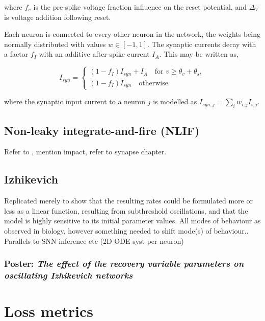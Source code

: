 \documentclass[mphil,deptreport,ai]{infthesis} %
\begin{document}
where $f_v$ is the pre-spike voltage fraction influence on the reset potential, and $\Delta_V$ is voltage addition following reset.

Each neuron is connected to every other neuron in the network, the weights being normally distributed with values $w \in [-1, 1]$. The synaptic currents decay with a factor $f_I$ with an additive after-spike current $I_A$. This may be written as,

\begin{equation}
    I_{syn} = \begin{cases}
        (1 - f_I) I_{syn} + I_A \quad \text{for } v \geq \theta_v + \theta_s,\\
        (1 - f_I) I_{syn} \quad \text{otherwise}
    \end{cases}
\end{equation}

where the synaptic input current to a neuron $j$ is modelled as $I_{syn,j} = \sum_{i} w_{i,j} I_{i,j}$.

\subsection{Non-leaky integrate-and-fire (NLIF)}

Refer to \cite{Huh2017}, mention impact, refer to synapse chapter.

\subsection{Izhikevich}

Replicated \cite{Oliveira2019} merely to show that the resulting rates could be formulated more or less as a linear function, resulting from subthreshold oscillations, and that the model is highly sensitive to its initial parameter values.
All modes of behaviour as observed in biology, however something needed to shift mode(s) of behaviour..
Parallels to SNN inference etc
(2D ODE syst per neuron)

\subsubsection{Poster: \textit{The effect of the recovery variable parameters on oscillating Izhikevich networks}}



\section{Loss metrics}
\end{document}
